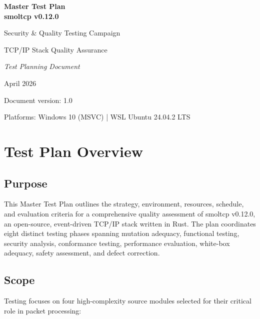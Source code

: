 \documentclass[11pt,a4paper]{article}
\begin{document}
\begin{titlepage}
\centering
\vspace*{2cm}
{\Huge\bfseries\color{sectionblue} Master Test Plan\\[0.4cm] smoltcp v0.12.0\par}
\vspace{1.5cm}
{\Large Security \& Quality Testing Campaign\par}
\vspace{1cm}
{\large TCP/IP Stack Quality Assurance\par}
\vspace{2cm}
{\large\textit{Test Planning Document}\par}
\vspace{0.5cm}
{\large April 2026\par}
\vfill
{\small Document version: 1.0\par}
{\small Platforms: Windows 10 (MSVC) | WSL Ubuntu 24.04.2 LTS\par}
\end{titlepage}

\tableofcontents
\newpage

\section{Test Plan Overview}

\subsection{Purpose}

This Master Test Plan outlines the strategy, environment, resources, schedule, and evaluation criteria for a comprehensive quality assessment of smoltcp v0.12.0, an open-source, event-driven TCP/IP stack written in Rust. The plan coordinates eight distinct testing phases spanning mutation adequacy, functional testing, security analysis, conformance testing, performance evaluation, white-box adequacy, safety assessment, and defect correction.

\subsection{Scope}

Testing focuses on four high-complexity source modules selected for their critical role in packet processing:
\end{document}
